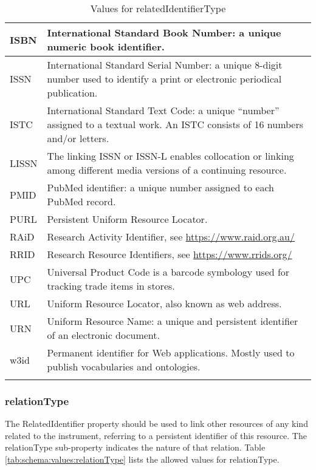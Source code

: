 \documentclass[titlepage=true,twoside=false,DIV=13]{scrartcl}
\begin{document}
\begin{longtable}{|l|p{\valdefcolw}|}
  ISBN    &
  International Standard Book Number: a unique numeric book identifier.
  \\ \hline
  ISSN    &
  International Standard Serial Number: a unique 8-digit number used
  to identify a print or electronic periodical publication.
  \\ \hline
  ISTC    &
  International Standard Text Code: a unique ``number'' assigned to a
  textual work.  An ISTC consists of 16 numbers and/or letters.
  \\ \hline
  LISSN   &
  The linking ISSN or ISSN-L enables collocation or linking among
  different media versions of a continuing resource.
  \\ \hline
  PMID    &
  PubMed identifier: a unique number assigned to each PubMed record.
  \\ \hline
  PURL    &
  Persistent Uniform Resource Locator.
  \\ \hline
  RAiD    &
  Research Activity Identifier, see \url{https://www.raid.org.au/}
  \\ \hline
  RRID    &
  Research Resource Identifiers, see \url{https://www.rrids.org/}
  \\ \hline
  UPC     &
  Universal Product Code is a barcode symbology used for tracking
  trade items in stores.
  \\ \hline
  URL     &
  Uniform Resource Locator, also known as web address.
  \\ \hline
  URN     &
  Uniform Resource Name: a unique and persistent identifier of an
  electronic document.
  \\ \hline
  w3id    &
  Permanent identifier for Web applications.  Mostly used to publish
  vocabularies and ontologies.
  \\ \hline
  \caption{Values for relatedIdentifierType}
  \label{tab:schema:values:relatedIdentifierType}
\end{longtable}

\subsubsection{relationType}

The RelatedIdentifier property should be used to link other resources
of any kind related to the instrument, referring to a persistent
identifier of this resource.  The relationType sub-property indicates
the nature of that relation.  Table
\ref{tab:schema:values:relationType} lists the allowed values for
relationType.
\end{document}
